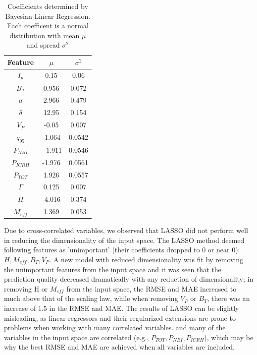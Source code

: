 \documentclass[a4paper, twoside, final, 12pt]{article}
\begin{document}
{\begin{table}
\centering
\vspace{-15pt}
\caption{Coefficients determined by Bayesian Linear Regression. Each coefficent is a normal distribution with mean $\mu$ and spread $\sigma^2$}\label{tab:new_coef}
\begin{tabular}{ | c | c | c |}
			\hline
			Feature & $\mu$ & $\sigma^2$ \\
			\hline
			$I_p$ & 0.15 & 0.06 \\
			$B_T$ & 0.956 & 0.072 \\
			$a$ & 2.966 & 0.479 \\
			$\delta$ & 12.95 & 0.154 \\
			$V_P$ & -0.05 & 0.007 \\
			$q_{95}$ & -1.064 & 0.0542 \\
			$P_{NBI}$ & $-1.911$ & 0.0546 \\
			$P_{ICRH}$ & -1.976 & 0.0561 \\
			$P_{TOT}$ & 1.926 & 0.0557 \\
			$\Gamma$ & 0.125 & 0.007 \\
			$H$ & -4.016 & 0.374  \\
			$M_{eff}$ & 1.369 & 0.053 \\
			\hline
\end{tabular}
\end{table}
Due to cross-correlated variables, we observed that LASSO did not perform well in reducing the dimensionality of the input space. 
The LASSO method deemed following features as 'unimportant' (their coefficients dropped to 0 or near 0): $H, M_{eff}, B_T, V_P$.
A new model with reduced dimensionality was fit by removing the unimportant features from the input space and it was seen that the prediction quality decreased dramatically with any reduction of dimensionality; in removing H or $M_{eff}$ from the input space, the RMSE and MAE increased to much above that of the scaling law, while when removing $V_P$ or $B_T$, there was an increase of 1.5 in the RMSE and MAE. 
The results of LASSO can be slightly misleading, as linear regressors and their regularized extensions are prone to problems when working with many correlated variables. and many of the variables in the input space are correlated (e.g., $P_{TOT}, P_{NBI}, P_{ICRH}$), which may be why the best RMSE and MAE are achieved when all variables are included.

}
\end{document}
